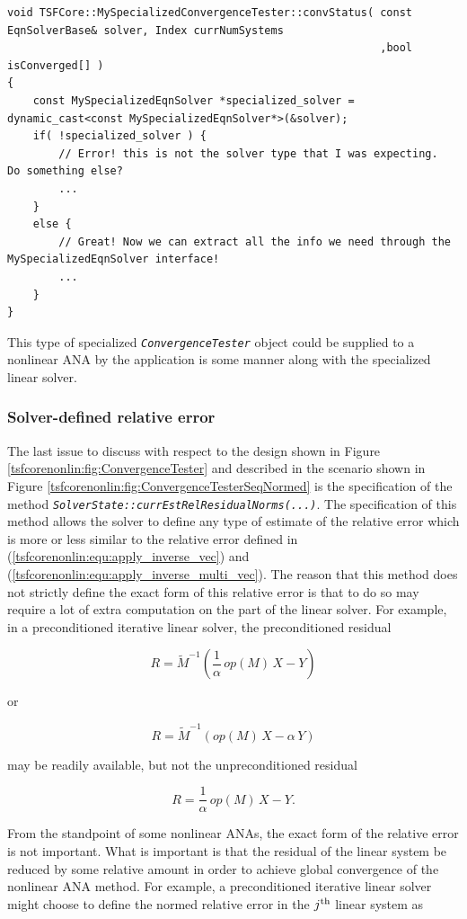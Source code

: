 {\scriptsize\begin{verbatim}
void TSFCore::MySpecializedConvergenceTester::convStatus( const EqnSolverBase& solver, Index currNumSystems
                                                          ,bool isConverged[] )
{
    const MySpecializedEqnSolver *specialized_solver = dynamic_cast<const MySpecializedEqnSolver*>(&solver);
    if( !specialized_solver ) {
        // Error! this is not the solver type that I was expecting.  Do something else?
        ...
    }
    else {
        // Great! Now we can extract all the info we need through the MySpecializedEqnSolver interface!
        ...
    }
}
\end{verbatim}}

This type of specialized \texttt{\textit{ConvergenceTester}} object could
be supplied to a nonlinear ANA by the application is some manner along
with the specialized linear solver.

%
\subsubsection*{Solver-defined relative error}
\label{tsfcorenonlin:sec:solver_defined_rel_err}
%

The last issue to discuss with respect to the design shown in Figure
\ref{tsfcorenonlin:fig:ConvergenceTester} and described in the scenario shown in
Figure \ref{tsfcorenonlin:fig:ConvergenceTesterSeqNormed} is the specification of
the method
\texttt{\textit{SolverState\-::curr\-Est\-Rel\-Residual\-Norms(...)}}.  The
specification of this method allows the solver to define any type of
estimate of the relative error which is more or less similar to the
relative error defined in (\ref{tsfcorenonlin:equ:apply_inverse_vec}) and
(\ref{tsfcorenonlin:equ:apply_inverse_multi_vec}).  The reason that this method
does not strictly define the exact form of this relative error is that
to do so may require a lot of extra computation on the part of the
linear solver.  For example, in a preconditioned iterative linear
solver, the preconditioned residual

\[
R = \tilde{M}^{-1} \left( \frac{1}{\alpha}\,op(M)\,X - Y \right)
\]

or

\[
R = \tilde{M}^{-1} \left( op(M)\,X - \alpha\,Y \right)
\]

may be readily available, but not the unpreconditioned residual

\[
R = \frac{1}{\alpha}\,op(M)\,X - Y.
\]

From the standpoint of some nonlinear ANAs, the exact form of the
relative error is not important.  What is important is that the
residual of the linear system be reduced by some relative amount in
order to achieve global convergence of the nonlinear ANA method.  For
example, a preconditioned iterative linear solver might choose to
define the normed relative error in the $j^{\scriptsize\mbox{th}}$
linear system as

